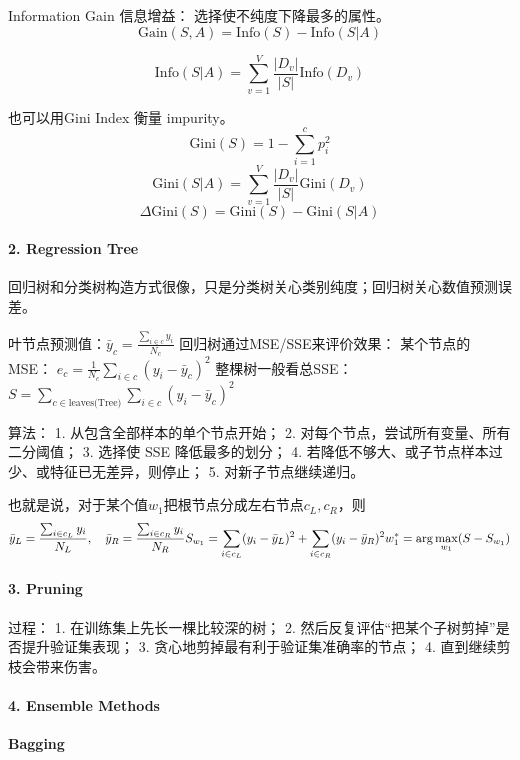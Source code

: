\documentclass[
]{ctexart}
\begin{document}
Information Gain 信息增益： 选择使不纯度下降最多的属性。
\[\text{Gain}(S, A) = \text{Info}(S) - \text{Info}(S|A)\]

\[\text{Info}(S|A) = \sum_{v=1}^V \frac{|D_v|}{|S|} \text{Info}(D_v)\]

也可以用Gini Index 衡量 impurity。
\[\text{Gini}(S) = 1 - \sum_{i=1}^c p_i^2\]
\[\text{Gini}(S|A) = \sum_{v=1}^V \frac{|D_v|}{|S|} \text{Gini}(D_v)\]
\[ \Delta \text{Gini}(S) = \text{Gini}(S) - \text{Gini}(S|A)\]

\paragraph{2. Regression Tree}\label{regression-tree}

回归树和分类树构造方式很像，只是分类树关心类别纯度；回归树关心数值预测误差。

叶节点预测值：\(\bar{y}_c = \frac{\sum_{i \in c} y_i}{N_c}\)
回归树通过MSE/SSE来评价效果： 某个节点的MSE：
\(e_c = \frac{1}{N_c} \sum_{i \in c} (y_i - \bar{y}_c)^2\)
整棵树一般看总SSE：
\(S = \sum_{c \in \text{leaves(Tree)}} \sum_{i \in c} (y_i - \bar{y}_c)^2\)

算法： 1. 从包含全部样本的单个节点开始； 2.
对每个节点，尝试所有变量、所有二分阈值； 3. 选择使 SSE 降低最多的划分；
4. 若降低不够大、或子节点样本过少、或特征已无差异，则停止； 5.
对新子节点继续递归。

也就是说，对于某个值\(w_1\)把根节点分成左右节点\(c_L, c_R\)，则
\[\bar{y}_L = \frac{\sum_{i \in c_L} y_i}{N_L}, \quad \bar{y}_R = \frac{\sum_{i \in c_R} y_i}{N_R} \\
S_{w_1} = \sum_{i \in c_L} (y_i - \bar{y}_L)^2 + \sum_{i \in c_R} (y_i - \bar{y}_R)^2\\
w_1^* = \arg \max_{w_1} (S-S_{w_1})\]

\paragraph{3. Pruning}\label{pruning}

过程： 1. 在训练集上先长一棵比较深的树； 2.
然后反复评估``把某个子树剪掉''是否提升验证集表现； 3.
贪心地剪掉最有利于验证集准确率的节点； 4. 直到继续剪枝会带来伤害。

\paragraph{4. Ensemble Methods}\label{ensemble-methods}

\textbf{Bagging}
\end{document}

